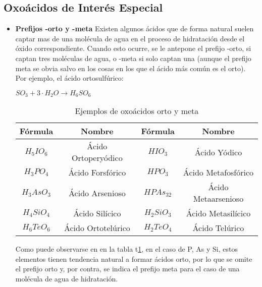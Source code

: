 \documentclass[11pt,fleqn]{book} %
\begin{document}
\subsection{Oxoácidos de Interés Especial}

\begin{itemize}
	\item \textbf{Prefijos -orto y -meta} Existen algunos ácidos que de forma natural suelen captar mas de una molécula de agua en el proceso de hidratación desde el óxido correspondiente. Cuando esto ocurre, se le antepone el prefijo -orto, si captan tres moléculas de agua, o -meta si solo captan una (aunque el prefijo meta se obvia salvo en los cosas en los que el ácido más común es el orto). Por ejemplo, el ácido ortosulfúrico:
	\begin{center}
		$SO_3 + 3\cdot H_{2}O \rightarrow  H_{6}SO_{6}$
	\end{center}
	\begin{table}[h!]
		\centering
		\begin{tabular}{c|c|c|c}
			Fórmula&Nombre&Fórmula&Nombre\\ \hline
			$H_{5}IO_{6}$&Ácido Ortoperyódico&$HIO_{3}$&Ácido Yódico\\
			$H_{3}PO_{4}$&Ácido Forsfórico&$HPO_{3}$&Ácido Metafosfórico\\
			$H_{3}AsO_{3}$&Ácido Arsenioso&$HPAs_{32}$&Ácido Metaarsenioso\\
			$H_{4}SiO_{4}$&Ácido Silícico&$H_{2}SiO_{3}$&Ácido Metasilícico\\
			$H_{6}TeO_{6}$&Ácido Ortotelúrico&$H_{2}TeO_{4}$&Ácido Telúrico\\ \hline
		\end{tabular}
		\caption{Ejemplos de oxoácidos orto y meta}
		\label{tab:orto}
	\end{table}
	Como puede observarse en en la tabla t\ref{tab:orto}, en el caso de P, As y Si, estos elementos tienen tendencia natural a formar ácidos orto, por lo que se omite el prefijo orto y, por contra, se indica el prefijo meta para el caso de una molécula de agua de hidratación.\\
	

\end{itemize}
\end{document}
